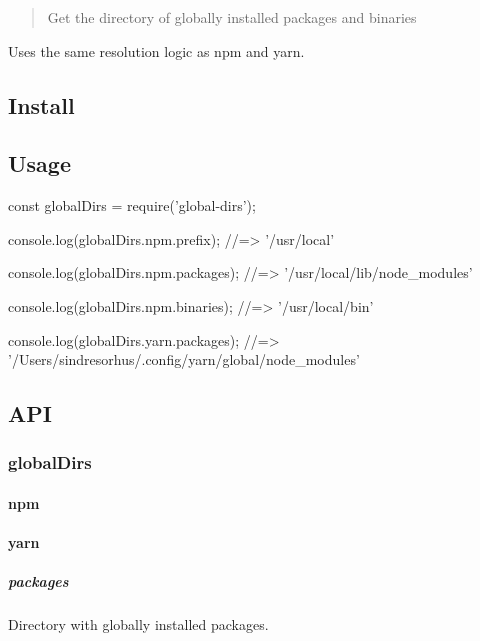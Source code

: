 \begin{quote}
Get the directory of globally installed packages and binaries \end{quote}


Uses the same resolution logic as {\ttfamily npm} and {\ttfamily yarn}.

\subsection*{Install}




\subsection*{Usage}


\begin{DoxyCode}
const globalDirs = require('global-dirs');

console.log(globalDirs.npm.prefix);
//=> '/usr/local'

console.log(globalDirs.npm.packages);
//=> '/usr/local/lib/node\_modules'

console.log(globalDirs.npm.binaries);
//=> '/usr/local/bin'

console.log(globalDirs.yarn.packages);
//=> '/Users/sindresorhus/.config/yarn/global/node\_modules'
\end{DoxyCode}


\subsection*{A\+PI}

\subsubsection*{global\+Dirs}

\paragraph*{npm}

\paragraph*{yarn}

\subparagraph*{packages}

Directory with globally installed packages.

